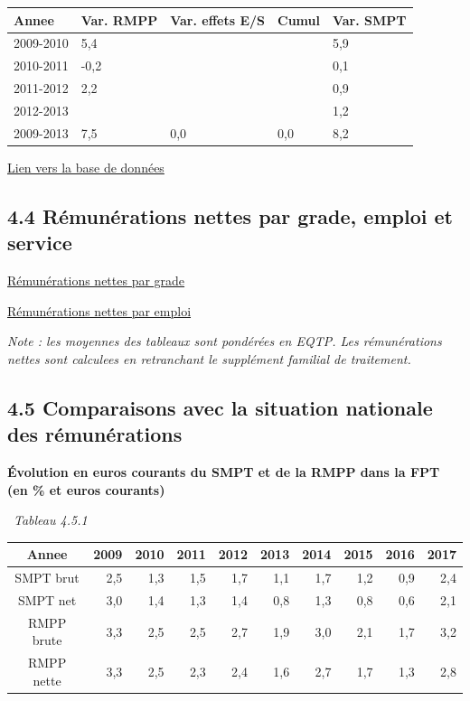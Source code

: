 \begin{longtable}[]{@{}lllll@{}}
\toprule
Annee & Var. RMPP & Var. effets E/S & Cumul & Var. SMPT\tabularnewline
\midrule
\endhead
2009-2010 & 5,4 & & & 5,9\tabularnewline
2010-2011 & -0,2 & & & 0,1\tabularnewline
2011-2012 & 2,2 & & & 0,9\tabularnewline
2012-2013 & & & & 1,2\tabularnewline
2009-2013 & 7,5 & 0,0 & 0,0 & 8,2\tabularnewline
\bottomrule
\end{longtable}

\href{../Bases/Remunerations/Anavar.synthese.csv}{Lien vers la base de
données}

\hypertarget{remunerations-nettes-par-grade-emploi-et-service}{%
\subsection{4.4 Rémunérations nettes par grade, emploi et
service}\label{remunerations-nettes-par-grade-emploi-et-service}}

\href{../Bases/Remunerations/net.grades.csv}{Rémunérations nettes par
grade}

\href{../Bases/Remunerations/net.emplois.csv}{Rémunérations nettes par
emploi}

\emph{Note : les moyennes des tableaux sont pondérées en EQTP. Les
rémunérations nettes sont calculees en retranchant le supplément
familial de traitement.}

\hypertarget{comparaisons-avec-la-situation-nationale-des-remunerations}{%
\subsection{4.5 Comparaisons avec la situation nationale des
rémunérations}\label{comparaisons-avec-la-situation-nationale-des-remunerations}}

\textbf{Évolution en euros courants du SMPT et de la RMPP dans la FPT
(en \% et euros courants)}

~\emph{Tableau 4.5.1}

\begin{longtable}[]{@{}crrrrrrrrr@{}}
\toprule
Annee & 2009 & 2010 & 2011 & 2012 & 2013 & 2014 & 2015 & 2016 &
2017\tabularnewline
\midrule
\endhead
SMPT brut & 2,5 & 1,3 & 1,5 & 1,7 & 1,1 & 1,7 & 1,2 & 0,9 &
2,4\tabularnewline
SMPT net & 3,0 & 1,4 & 1,3 & 1,4 & 0,8 & 1,3 & 0,8 & 0,6 &
2,1\tabularnewline
RMPP brute & 3,3 & 2,5 & 2,5 & 2,7 & 1,9 & 3,0 & 2,1 & 1,7 &
3,2\tabularnewline
RMPP nette & 3,3 & 2,5 & 2,3 & 2,4 & 1,6 & 2,7 & 1,7 & 1,3 &
2,8\tabularnewline
\bottomrule
\end{longtable}

